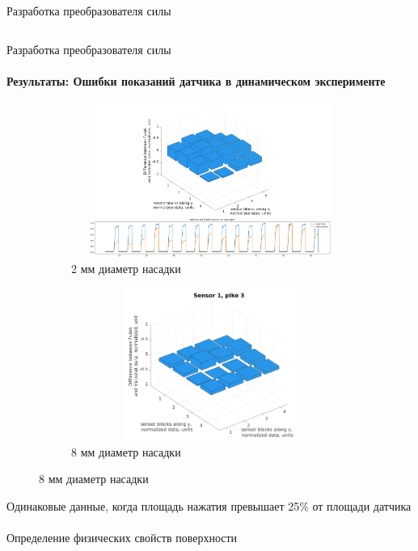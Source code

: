 \documentclass[aspectratio=169,xcolor=table,10pt]{beamer}
\begin{document}
\begin{frame}[t]{Разработка преобразователя силы}
\begin{columns}[T,onlytextwidth]
\begin{column}{0.39\textwidth}
        \end{column}
    \end{columns}
\end{frame}

\begin{frame}[t]{Разработка преобразователя силы}
    \framesubtitle{Результаты: Ошибки показаний датчика в динамическом эксперименте}
    \vspace{-15pt}
    \begin{figure}[H]
        \begin{subfigure}{0.64\textwidth}
            \centering\includegraphics[height=5cm,width=1\textwidth,keepaspectratio]{sens1_pike1_mod.png}
            \caption*{2 мм диаметр насадки}
            \label{fig:sens1_pike1}
        \end{subfigure}
        \begin{subfigure}{0.34\textwidth}
            \centering\includegraphics[height=5cm,width=1\textwidth,keepaspectratio]{sens1_pike3.png}
            \caption*{8 мм диаметр насадки}
            \label{fig:sens1_pike3}
        \end{subfigure}
    \end{figure}
    \vspace{-0.8cm}
    \alert{Одинаковые данные, когда площадь нажатия превышает 25\% от площади датчика}
\end{frame}


\begin{frame}[c]{}
    \framesubtitle{}
    \centering\LARGE Определение физических свойств поверхности
\end{frame}
\end{document}
